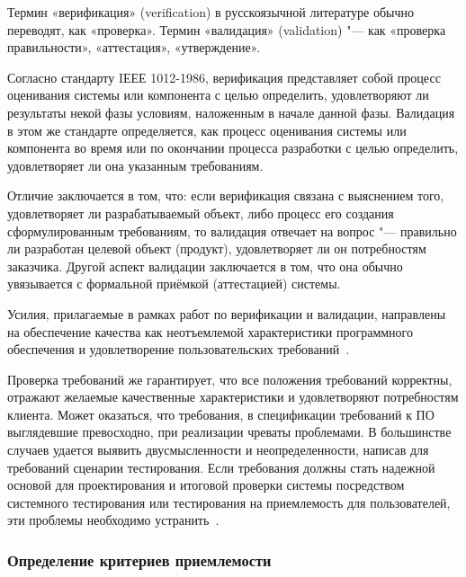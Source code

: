 \documentclass{../industrial-development}
\begin{document}
{\begin{frame}
\end{frame}
\lecturenotes

Термин \alert{«верификация» (verification)} в русскоязычной литературе обычно переводят, как «проверка». Термин \alert{«валидация» (validation)} "--- как «проверка правильности», «аттестация», «утверждение».

Согласно стандарту IЕЕЕ 1012-1986, верификация представляет собой процесс оценивания системы или компонента с целью определить, удовлетворяют ли результаты некой фазы условиям, наложенным в начале данной фазы. Валидация в этом же стандарте определяется, как процесс оценивания системы или компонента во время или по окончании процесса разработки с целью определить, удовлетворяет ли она
указанным требованиям.

Отличие заключается в том, что: если верификация связана с выяснением того, удовлетворяет ли разрабатываемый объект, либо
процесс его создания сформулированным требованиям, то валидация отвечает на вопрос "--- правильно ли разработан целевой объект (продукт), удовлетворяет ли он потребностям заказчика. Другой аспект валидации заключается в том, что она обычно увязывается с
формальной приёмкой (аттестацией) системы.

Усилия, прилагаемые в рамках работ по верификации и валидации, направлены на обеспечение качества как неотъемлемой характеристики программного обеспечения и удовлетворение пользовательских требований~\cite[с.~64--65]{Maglinec}.

Проверка требований же гарантирует, что все положения требований корректны, отражают желаемые качественные характеристики и удовлетворяют потребностям клиента. Может оказаться, что требования, в спецификации требований к ПО выглядевшие превосходно, при реализации чреваты проблемами. В большинстве случаев удается выявить двусмысленности и неопределенности, написав для требований сценарии тестирования. Если требования должны стать надежной основой для проектирования и итоговой проверки системы посредством системного тестирования или тестирования на приемлемость для пользователей, эти проблемы необходимо устранить~\cite[с.~51]{Wiegers}.


\begin{frame} \frametitle {Определение критериев приемлемости}


\end{frame}}
\end{document}
